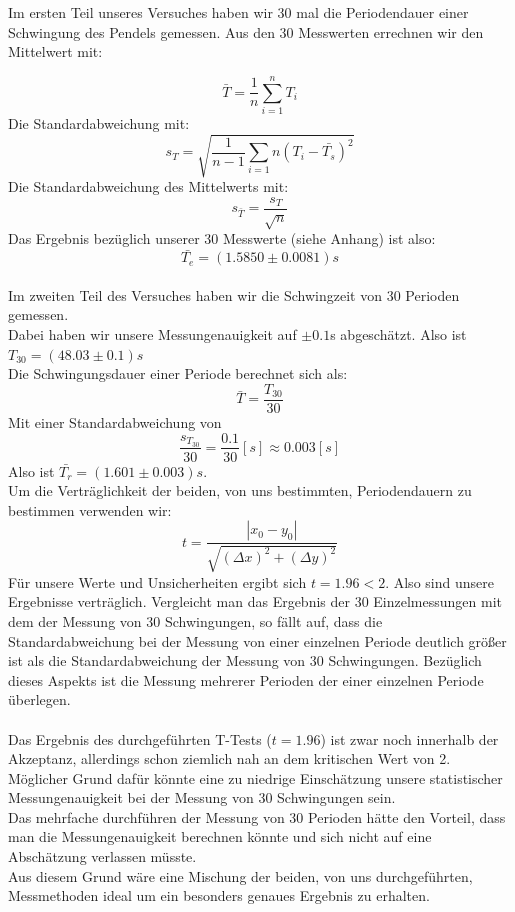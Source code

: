 \documentclass[11pt,a4paper]{article}
\begin{document}
	Im ersten Teil unseres Versuches haben wir 30 mal die Periodendauer einer Schwingung des Pendels
	gemessen. Aus den 30 Messwerten errechnen wir den Mittelwert mit:

	\begin{equation}
	\bar{T} = \frac{1}{n} \sum_{i=1}^{n} T_i
	\end{equation}
	Die Standardabweichung mit:
	\begin{equation}
	s_T=\sqrt{\frac{1}{n-1}\sum_{i=1}{n} (T_i - \bar{T_s})^2}
	\end{equation}
	Die Standardabweichung des Mittelwerts mit:
	\begin{equation}
	s_{\bar{T}}=\frac{s_T}{\sqrt{n}}
	\end{equation}
	Das Ergebnis bezüglich unserer 30 Messwerte (siehe Anhang) ist also:
	\begin{equation*}
	\bar{T_e}=(1.5850 \pm 0.0081)s
	\end{equation*}
	\\ \newpage
	Im zweiten Teil des Versuches haben wir die Schwingzeit von 30 Perioden gemessen. \\
	Dabei haben wir unsere Messungenauigkeit auf $\pm 0.1$s abgeschätzt. Also ist $T_{30}=(48.03\pm 0.1)s$
	\\
	Die Schwingungsdauer einer Periode berechnet sich als:
	\begin{equation*}
	\bar{T}=\frac{T_{30}}{30}
	\end{equation*}
	Mit einer Standardabweichung von $$\frac{s_{T_{30}}}{30}=\frac{0.1}{30}[s]\approx 0.003[s]$$
	Also ist $\bar{T_r}=(1.601\pm 0.003)s$. \\
	Um die Verträglichkeit der beiden, von uns bestimmten, Periodendauern zu bestimmen verwenden wir:
	\begin{equation}
	t=\frac{ |x_0 -y_0|}{\sqrt{(\Delta x)^2 + (\Delta y)^2}}
	\end{equation}
	Für unsere Werte und Unsicherheiten ergibt sich $t=1.96<2$. Also sind unsere Ergebnisse verträglich.
	\newpage
	Vergleicht man das Ergebnis der 30 Einzelmessungen mit dem der Messung von 30 Schwingungen,
	so fällt auf, dass die Standardabweichung bei der Messung von einer einzelnen Periode deutlich
	größer ist als die Standardabweichung der Messung von 30 Schwingungen.
	Bezüglich dieses Aspekts ist die Messung mehrerer Perioden der einer einzelnen Periode überlegen.
	\\
	\\
	Das Ergebnis des durchgeführten T-Tests ($t=1.96$) ist zwar noch innerhalb der Akzeptanz, allerdings schon
	ziemlich nah an dem kritischen Wert von 2.
	Möglicher Grund dafür könnte eine zu niedrige Einschätzung unsere statistischer Messungenauigkeit bei der Messung von 30 Schwingungen sein.
	\\Das mehrfache durchführen der Messung von 30 Perioden hätte den Vorteil, dass man die Messungenauigkeit berechnen könnte und sich nicht auf eine Abschätzung verlassen müsste.
	\\
	Aus diesem Grund wäre eine Mischung der beiden, von uns durchgeführten, Messmethoden ideal um ein
	besonders genaues Ergebnis zu erhalten.
\end{document}
